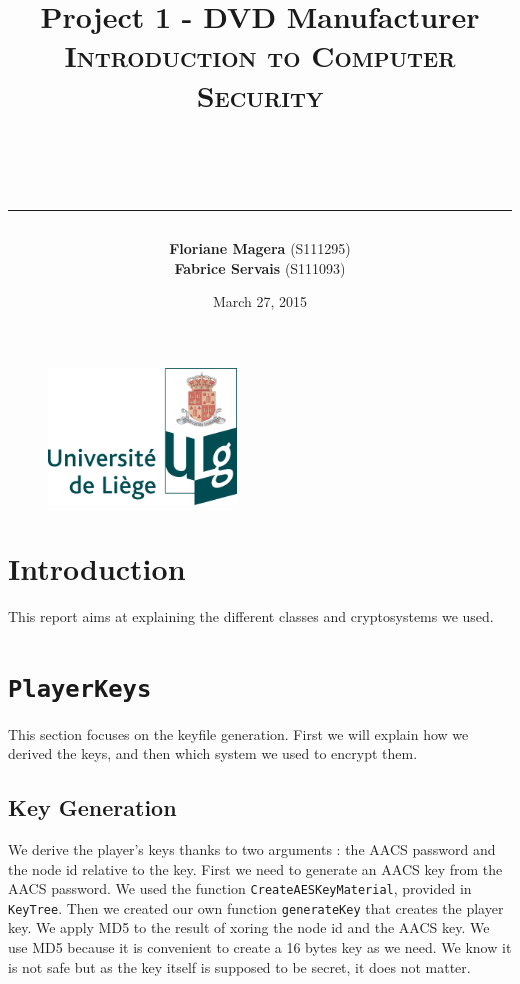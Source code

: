 \documentclass[a4paper,titlepage]{article}
\begin{document}
\begin{titlepage}

\begin{figure}
\centering
\includegraphics[width=5cm]{logo-ulg.png}
\end{figure}



\title{
\vspace{0.2cm}
\LARGE{\textbf{Project 1 - DVD Manufacturer}} \\ \textsc{Introduction to Computer Security}
\author{\textbf{Floriane Magera} \small{(S111295})\\\textbf{Fabrice Servais} \small{(S111093})}\\
\date{March 27, 2015}
\rule{15cm}{1.5pt}
}

\end{titlepage}

\pagestyle{fancy}

\maketitle


\section{Introduction}
This report aims at explaining the different classes and cryptosystems we used.

\section{\texttt{PlayerKeys}}
This section focuses on the keyfile generation. First we will explain how we derived the keys, and then which system we used to encrypt them.

	\subsection{Key Generation}
	We derive the player's keys thanks to two arguments : the AACS password and the node id relative to the key. First we need to generate an AACS 		key from the AACS password. We used the function \texttt{CreateAESKeyMaterial}, provided in \texttt{KeyTree}. Then we created our own function 		\texttt{generateKey} that creates the player key. We apply MD5 to the result of xoring the node id and the AACS key. We use MD5 because it is 		convenient to create a 16 bytes key as we need. We know it is not safe but as the key itself is supposed to be secret, it does not matter. 
	
\end{document}
